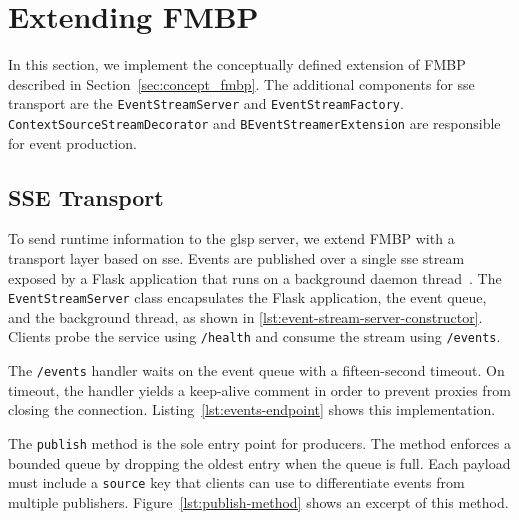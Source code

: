 \section{Extending FMBP}
\label{sec:impl_fmbp}
 
In this section, we implement the conceptually defined extension of FMBP described in Section~\ref{sec:concept_fmbp}.
The additional components for \gls{sse} transport are the \texttt{EventStreamServer} and \texttt{EventStreamFactory}.
\texttt{ContextSourceStreamDecorator} and \texttt{BEventStreamerExtension} are responsible for event production.

\subsection{SSE Transport}
\label{subsec:impl_fmbp_sse}

To send runtime information to the \gls{glsp} server, we extend FMBP with a transport layer based on \gls{sse}.
Events are published over a single \gls{sse} stream exposed by a Flask application that runs on a background daemon thread~\cite{noauthor_palletsflask_2026}.
The \texttt{EventStreamServer} class encapsulates the Flask application, the event queue, and the background thread, as shown in \autoref{lst:event-stream-server-constructor}.
Clients probe the service using \texttt{/health} and consume the stream using \texttt{/events}.



The \texttt{/events} handler waits on the event queue with a fifteen-second timeout.
On timeout, the handler yields a keep-alive comment in order to prevent proxies from closing the connection.
Listing~\ref{lst:events-endpoint} shows this implementation.



The \texttt{publish} method is the sole entry point for producers.
The method enforces a bounded queue by dropping the oldest entry when the queue is full.
Each payload must include a \texttt{source} key that clients can use to differentiate events from multiple publishers.
Figure~\ref{lst:publish-method} shows an excerpt of this method.

